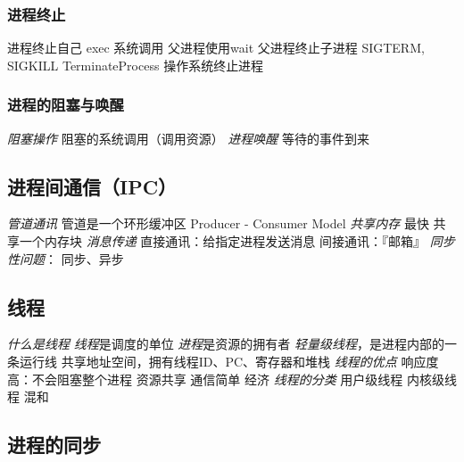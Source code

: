 \documentclass{ctexart}
\begin{document}
\subsubsection{进程终止}
\begin{outline}
    \1 进程终止自己 exec 系统调用
        \2 父进程使用wait
    \1 父进程终止子进程
        \2 SIGTERM, SIGKILL
        \2 TerminateProcess
    \1 操作系统终止进程
\end{outline}
\subsubsection{进程的阻塞与唤醒}
\begin{outline}
    \1 \emph{阻塞操作} 阻塞的系统调用（调用资源）
    \1 \emph{进程唤醒} 等待的事件到来
\end{outline}
\subsection{进程间通信（IPC）}
\begin{outline}
    \1 \emph{管道通讯}
        \2 管道是一个环形缓冲区
        \2 Producer - Consumer Model
    \1 \emph{共享内存}
        \2 最快
        \2 共享一个内存块
    \1 \emph{消息传递}
        \2 直接通讯：给指定进程发送消息
        \2 间接通讯：『邮箱』
    \1 \emph{同步性问题}： 同步、异步
\end{outline}
\subsection{线程}
\begin{outline}
    \1 \emph{什么是线程}
        \2 \emph{线程}是调度的单位
        \2 \emph{进程}是资源的拥有者
        \2 \emph{轻量级线程}，是进程内部的一条运行线
        \2 共享地址空间，拥有线程ID、PC、寄存器和堆栈
    \1 \emph{线程的优点}
        \2 响应度高：不会阻塞整个进程
        \2 资源共享
        \2 通信简单
        \2 经济
    \1 \emph{线程的分类}
        \2 用户级线程
        \2 内核级线程
        \2 混和
\end{outline}
\subsection{进程的同步}
\end{document}
